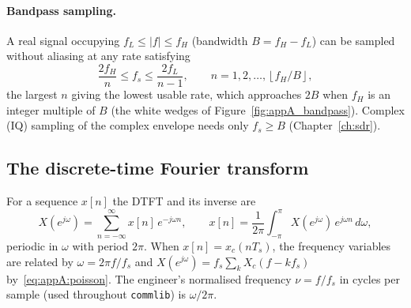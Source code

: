 
\paragraph{Bandpass sampling.} A real signal occupying $f_L\le|f|\le f_H$ (bandwidth
$B=f_H-f_L$) can be sampled without aliasing at any rate satisfying
\begin{equation}
\frac{2f_H}{n}\le f_s\le\frac{2f_L}{n-1},\qquad n=1,2,\dots,\left\lfloor f_H/B\right\rfloor,
\label{eq:appA:bandpass}
\end{equation}
the largest $n$ giving the lowest usable rate, which approaches $2B$ when $f_H$ is an integer
multiple of $B$ (the white wedges of Figure~\ref{fig:appA_bandpass}). Complex (IQ) sampling of the
complex envelope needs only $f_s\ge B$ (Chapter~\ref{ch:sdr}).


\subsection{The discrete-time Fourier transform}

For a sequence $x[n]$ the DTFT and its inverse are
\begin{equation}
X(e^{j\omega})=\sum_{n=-\infty}^{\infty}x[n]\,e^{-j\omega n},\qquad
x[n]=\frac1{2\pi}\int_{-\pi}^{\pi}X(e^{j\omega})\,e^{j\omega n}\,d\omega,
\label{eq:appA:dtft}
\end{equation}
periodic in $\omega$ with period $2\pi$. When $x[n]=x_c(nT_s)$, the frequency variables are
related by $\omega=2\pi f/f_s$ and $X(e^{j\omega})=f_s\sum_kX_c(f-kf_s)$ by~\eqref{eq:appA:poisson}.
The engineer's normalised frequency $\nu=f/f_s$ in cycles per sample (used throughout
\texttt{commlib}) is $\omega/2\pi$.

